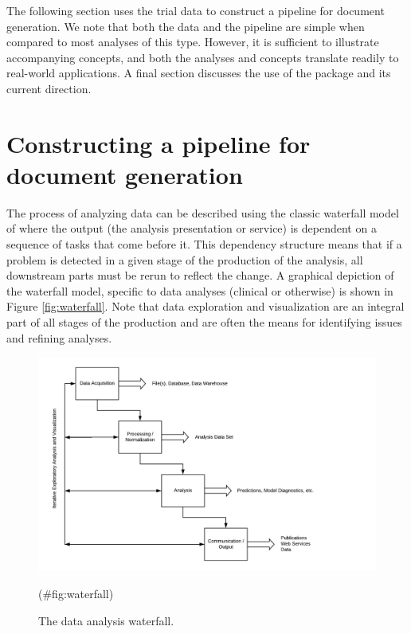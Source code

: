 \noindent The following section uses the trial data to construct a
pipeline for document generation. We note that both the data and the
pipeline are simple when compared to most analyses of this type.
However, it is sufficient to illustrate accompanying concepts, and both
the analyses and concepts translate readily to real-world applications.
A final section discusses the use of the package and its current
direction.

\hypertarget{constructing-a-pipeline-for-document-generation}{%
\section{Constructing a pipeline for document
generation}\label{constructing-a-pipeline-for-document-generation}}

The process of analyzing data can be described using the classic
waterfall model of \citet{benington1983} where the output (the analysis
presentation or service) is dependent on a sequence of tasks that come
before it. This dependency structure means that if a problem is detected
in a given stage of the production of the analysis, all downstream parts
must be rerun to reflect the change. A graphical depiction of the
waterfall model, specific to data analyses (clinical or otherwise) is
shown in Figure \ref{fig:waterfall}. Note that data exploration and
visualization are an integral part of all stages of the production and
are often the means for identifying issues and refining analyses.

\begin{Schunk}
\begin{figure}[htbp]

{\centering \includegraphics[width=5in]{waterfall} 

}

\caption[The data analysis waterfall]{The data analysis waterfall.}(\#fig:waterfall)
\end{figure}
\end{Schunk}

